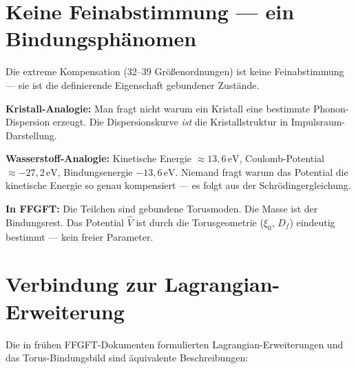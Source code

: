 \section{Keine Feinabstimmung --- ein Bindungsphänomen}

Die extreme Kompensation (32–39 Größenordnungen) ist keine Feinabstimmung —
sie ist die definierende Eigenschaft gebundener Zustände.

\textbf{Kristall-Analogie:} Man fragt nicht warum ein Kristall
eine bestimmte Phonon-Dispersion erzeugt. Die Dispersionskurve
\emph{ist} die Kristallstruktur in Impulsraum-Darstellung.

\textbf{Wasserstoff-Analogie:} Kinetische Energie $\approx 13{,}6\,\text{eV}$,
Coulomb-Potential $\approx -27{,}2\,\text{eV}$, Bindungsenergie $-13{,}6\,\text{eV}$.
Niemand fragt warum das Potential die kinetische Energie so genau kompensiert —
es folgt aus der Schrödingergleichung.

\textbf{In FFGFT:} Die Teilchen sind gebundene Torusmoden.
Die Masse ist der Bindungsrest. Das Potential $\hat{V}$ ist durch
die Torusgeometrie ($\xi_0$, $D_f$) eindeutig bestimmt —
kein freier Parameter.

\section{Verbindung zur Lagrangian-Erweiterung}

Die in frühen FFGFT-Dokumenten formulierten Lagrangian-Erweiterungen
und das Torus-Bindungsbild sind äquivalente Beschreibungen:

\begin{center}
{\scriptsize
{}}
\end{center}

